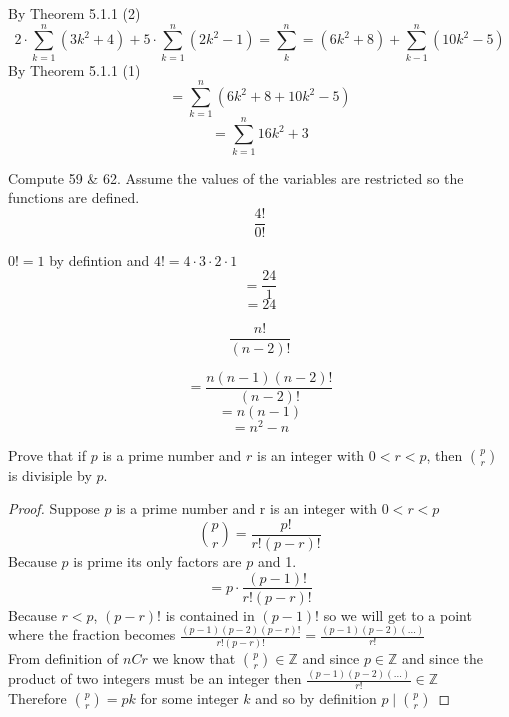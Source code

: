 \documentclass[12pt,letterpaper, onecolumn]{exam}
\begin{document}
\begin{questions}
		\begin{solution}
		By Theorem 5.1.1 (2)
		$$2\cdot\sum^{n}_{k=1}(3k^2+4)+5\cdot\sum^{n}_{k=1}(2k^2-1)=\sum^{n}_k=(6k^2+8)+\sum^{n}_{k-1}(10k^2-5)$$
				By Theorem 5.1.1 (1)
				$$=\sum^{n}_{k=1}(6k^2+8+10k^2-5)$$
								$$=\sum^{n}_{k=1}16k^2+3$$
		\end{solution}
		
		Compute 59 \& 62. Assume the values of the variables are restricted so the functions are defined.
		\setcounter{question}{58} \question $$\frac{4!}{0!}$$
		
		\begin{solution}
		$0!=1$ by defintion and $4!=4\cdot3\cdot2\cdot1$
		$$=\frac{24}{1}$$
		$$=24$$
		\end{solution}
		
		\setcounter{question}{61} \question $$\frac{n!}{(n-2)!}$$
		
		\begin{solution}
		$$=\frac{n(n-1)(n-2)!}{(n-2)!}$$
		$$=n(n-1)$$
		$$=n^2-n$$
		\end{solution}
		
		\setcounter{question}{73} \question Prove that if $p$ is a prime number and $r$ is an integer with $0<r<p$, then $\binom{p}{r}$ is divisiple by $p$.
		
		\begin{solution}
			\begin{proof}
				Suppose $p$ is a prime number and r is an integer with $0<r<p$\\
				$$\binom{p}{r}=\frac{p!}{r!(p-r)!}$$
				Because $p$ is prime its only factors are $p$ and 1.\\
				$$=p\cdot\frac{(p-1)!}{r!(p-r)!}$$
				Because $r<p$, $(p-r)!$ is contained in $(p-1)!$ so we will get to a point where the fraction becomes $\frac{(p-1)(p-2)(p-r)!}{r!(p-r)!}=\frac{(p-1)(p-2)(...)}{r!}$\\
				From definition of $nCr$ we know that $\binom{p}{r} \in \mathbb{Z}$ and since $p\in\mathbb{Z}$ and since the product of two integers must be an integer then $\frac{(p-1)(p-2)(...)}{r!} \in \mathbb{Z}$\\
				Therefore $\binom{p}{r}=pk$ for some integer $k$ and so by definition $p\mid\binom{p}{r}$
			\end{proof}
		\end{solution}
	\end{questions}
\end{document}
